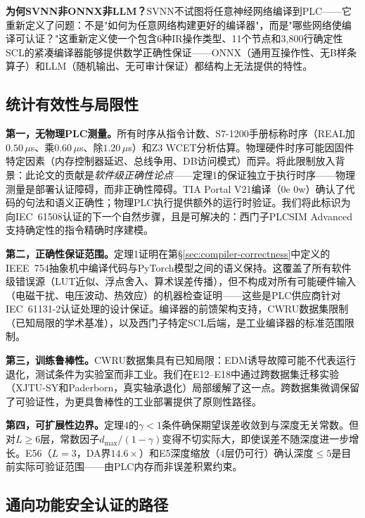 \documentclass[journal,onecolumn]{IEEEtran}
\theoremstyle{definition}
\theoremstyle{plain}
\theoremstyle{remark}
\begin{document}
\textbf{为何SVNN非ONNX非LLM？}SVNN不试图将任意神经网络编译到PLC——它重新定义了问题：不是"如何为任意网络构建更好的编译器"，而是"哪些网络使编译可认证？"这重新定义使一个包含6种IR操作类型、11个节点和3,800行确定性SCL的紧凑编译器能够提供数学正确性保证——ONNX（通用互操作性、无B样条算子）和LLM（随机输出、无可审计保证）都结构上无法提供的特性。

\subsection{统计有效性与局限性}
\label{sec:limitations}

\textbf{第一，无物理PLC测量。}所有时序从指令计数、S7-1200手册标称时序（REAL加$0.50\,\mu$s、乘$0.60\,\mu$s、除$1.20\,\mu$s）和Z3 WCET分析估算。物理硬件时序可能因固件特定因素（内存控制器延迟、总线争用、DB访问模式）而异。将此限制放入背景：此论文的贡献是\textit{软件级正确性论点}——定理1的保证独立于执行时序——物理测量是部署认证障碍，而非正确性障碍。TIA Portal V21编译（0e 0w）确认了代码的句法和语义正确性；物理PLC执行提供额外的运行时验证。我们将此标识为向IEC~61508认证的下一个自然步骤，且是可解决的：西门子PLCSIM Advanced支持确定性的指令精确时序建模。

\textbf{第二，正确性保证范围。}定理1证明在第{\S}\ref{sec:compiler-correctness}中定义的IEEE~754抽象机中编译代码与PyTorch模型之间的语义保持。这覆盖了所有软件级错误源（LUT近似、浮点舍入、算术误差传播），但不构成对所有可能硬件输入（电磁干扰、电压波动、热效应）的机器检查证明——这些是PLC供应商针对IEC~61131-2认证处理的设计保证。编译器的前馈架构支持，CWRU数据集限制（已知局限的学术基准），以及西门子特定SCL后端，是工业编译器的标准范围限制。

\textbf{第三，训练鲁棒性。}CWRU数据集具有已知局限：EDM诱导故障可能不代表运行退化，测试条件为实验室而非工业。我们在E12--E18中通过跨数据集迁移实验（XJTU-SY和Paderborn，真实轴承退化）局部缓解了这一点。跨数据集微调保留了可验证性，为更具鲁棒性的工业部署提供了原则性路径。

\textbf{第四，可扩展性边界。}定理4的$\gamma < 1$条件确保期望误差收敛到与深度无关常数。但对$L \geq 6$层，常数因子$d_{\max}/(1-\gamma)$变得不切实际大，即使误差不随深度进一步增长。E56（$L=3$，DA界$14.6\times$）和E5深度缩放（4层仍可行）确认深度$\leq 5$是目前实际可验证范围——由PLC内存而非误差积累约束。

\subsection{通向功能安全认证的路径}
\label{sec:safety-certification}
\end{document}

